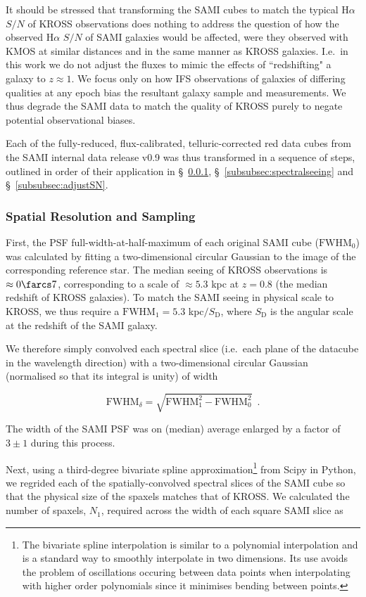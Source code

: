 \documentclass[a4paper,fleqn,usenatbib]{mnras}
\begin{document}
It should be stressed that transforming the SAMI cubes to match the typical H$\alpha$ $S/N$ of KROSS observations does nothing to address the question of how the observed H$\alpha$ $S/N$ of SAMI galaxies would be affected, were they observed with KMOS at similar distances and in the same manner as KROSS galaxies. I.e.\ in this work we do not adjust the fluxes to mimic the effects of ``redshifting" a galaxy to $z\approx1$. We focus only on how IFS observations of galaxies of differing qualities at any epoch bias the resultant galaxy sample and measurements. We thus degrade the SAMI data to match the quality of KROSS purely to negate potential observational biases. 

Each of the fully-reduced, flux-calibrated, telluric-corrected red data cubes from the SAMI internal data release v0.9 was thus transformed in a sequence of steps, outlined in order of their application in \S~\ref{subsubsec:spatialseeing},  \S~\ref{subsubsec:spectralseeing} and  \S~\ref{subsubsec:adjustSN}.

\subsubsection{Spatial Resolution and Sampling}
\label{subsubsec:spatialseeing}

First, the PSF full-width-at-half-maximum of each original SAMI cube ($\text{FWHM}_{\text{0}}$) was calculated by fitting a two-dimensional circular Gaussian to the image of the corresponding reference star. The median seeing of KROSS observations is $\approx 0\farcs7$, corresponding to a scale of $\approx5.3$ kpc at $z=0.8$ (the median redshift of KROSS galaxies). To match the SAMI seeing in physical scale to KROSS, we thus require a $\text{FWHM}_{1}=5.3$ kpc$/S_{\text{D}}$, where $S_{\text{D}}$ is the angular scale at the redshift of the SAMI galaxy.

We therefore simply convolved each spectral slice (i.e.\ each plane of the datacube in the wavelength direction) with a two-dimensional circular Gaussian (normalised so that its integral is unity) of width 

\begin{equation}
\text{FWHM}_{\delta} = \sqrt{\text{FWHM}_{1}^{2}-\text{FWHM}_{0}^{2}}\,\,\,.
\end{equation}
\label{eq:deltasig}

\noindent The width of the SAMI PSF was on (median) average enlarged by a factor of $3 \pm 1$ during this process.

Next, using a third-degree bivariate spline approximation\footnote{The bivariate spline interpolation is similar to a polynomial interpolation and is a standard way to smoothly interpolate in two dimensions. Its use avoids the problem of oscillations occuring between data points when interpolating with higher order polynomials since it minimises bending between points.} from {\sc Scipy} in {\sc Python}, we regrided each of the spatially-convolved spectral slices of the SAMI cube so that the physical size of the spaxels matches that of KROSS. We calculated the number of spaxels, $N_{\text{1}}$, required across the width of each square SAMI slice as 
\end{document}
